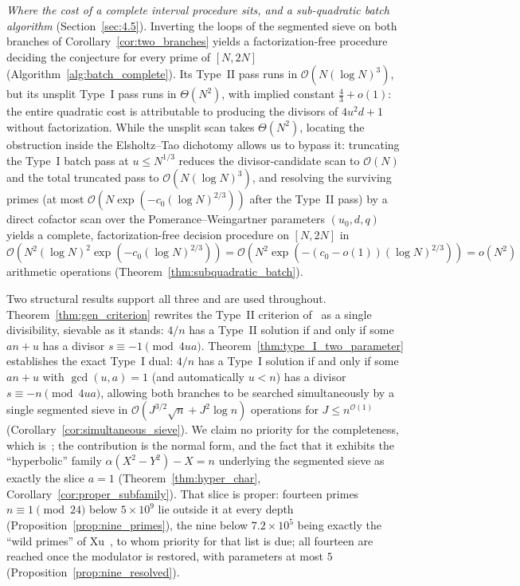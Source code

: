 \documentclass[11pt, a4paper]{article}
\theoremstyle{plain}
\theoremstyle{definition}
\begin{document}
\emph{Where the cost of a complete interval procedure sits, and a sub-quadratic batch algorithm} (Section~\ref{sec:4.5}). Inverting the loops of the segmented sieve on both branches of Corollary~\ref{cor:two_branches} yields a factorization-free procedure deciding the conjecture for every prime of $[N,2N]$ (Algorithm~\ref{alg:batch_complete}). Its Type~II pass runs in $\mathcal{O}(N(\log N)^{3})$, but its unsplit Type~I pass runs in $\Theta(N^{2})$, with implied constant $\tfrac43+o(1)$: the entire quadratic cost is attributable to producing the divisors of $4u^{2}d+1$ without factorization. While the unsplit scan takes $\Theta(N^{2})$, locating the obstruction inside the Elsholtz--Tao dichotomy allows us to bypass it: truncating the Type~I batch pass at $u\le N^{1/3}$ reduces the divisor-candidate scan to $\mathcal{O}(N)$ and the total truncated pass to $\mathcal{O}(N(\log N)^{3})$, and resolving the surviving primes (at most $\mathcal{O}(N\exp(-c_0(\log N)^{2/3}))$ after the Type~II pass) by a direct cofactor scan over the Pomerance--Weingartner parameters $(u_0,d,q)$ yields a complete, factorization-free decision procedure on $[N,2N]$ in $\mathcal{O}(N^{2}(\log N)^{2}\exp(-c_0(\log N)^{2/3}))=\mathcal{O}(N^{2}\exp(-(c_0-o(1))(\log N)^{2/3}))=o(N^{2})$ arithmetic operations (Theorem~\ref{thm:subquadratic_batch}).

Two structural results support all three and are used throughout. Theorem~\ref{thm:gen_criterion} rewrites the Type~II criterion of~\cite[Cor.~2.2]{pomerance2026} as a single divisibility, sievable as it stands: $4/n$ has a Type~II solution if and only if some $an+u$ has a divisor $s\equiv-1\pmod{4ua}$. Theorem~\ref{thm:type_I_two_parameter} establishes the exact Type~I dual: $4/n$ has a Type~I solution if and only if some $an+u$ with $\gcd(u,a)=1$ (and automatically $u<n$) has a divisor $s\equiv-n\pmod{4ua}$, allowing both branches to be searched simultaneously by a single segmented sieve in $\mathcal{O}(J^{3/2}\sqrt{n}+J^{2}\log n)$ operations for $J\le n^{\mathcal{O}(1)}$ (Corollary~\ref{cor:simultaneous_sieve}). We claim no priority for the completeness, which is~\cite{pomerance2026}; the contribution is the normal form, and the fact that it exhibits the ``hyperbolic'' family $\alpha(X^{2}-Y^{2})-X=n$ underlying the segmented sieve as exactly the slice $a=1$ (Theorem~\ref{thm:hyper_char}, Corollary~\ref{cor:proper_subfamily}). That slice is proper: fourteen primes $n\equiv1\pmod{24}$ below $5\times10^{9}$ lie outside it at every depth (Proposition~\ref{prop:nine_primes}), the nine below $7.2\times10^{5}$ being exactly the ``wild primes'' of Xu~\cite{xu2026}, to whom priority for that list is due; all fourteen are reached once the modulator is restored, with parameters at most $5$ (Proposition~\ref{prop:nine_resolved}).
\end{document}
